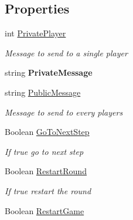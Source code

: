\subsection*{Properties}
\begin{DoxyCompactItemize}
\item 
int \hyperlink{class_coinche_1_1_tools_1_1_game_info_aa5889e94191b88dfacc058569858ec38}{Private\+Player}
\begin{DoxyCompactList}\small\item\em Message to send to a single player \end{DoxyCompactList}\item 
\mbox{\label{class_coinche_1_1_tools_1_1_game_info_a9cdbe2b9e1e98582fb4e7b843894e4a7}} 
string {\bfseries Private\+Message}
\item 
string \hyperlink{class_coinche_1_1_tools_1_1_game_info_a0b839fbdcb8a923a7c1061adfb1e8586}{Public\+Message}
\begin{DoxyCompactList}\small\item\em Message to send to every players \end{DoxyCompactList}\item 
Boolean \hyperlink{class_coinche_1_1_tools_1_1_game_info_ac591b0c4f8c2c2f90e6336b394d776c1}{Go\+To\+Next\+Step}
\begin{DoxyCompactList}\small\item\em If true go to next step \end{DoxyCompactList}\item 
Boolean \hyperlink{class_coinche_1_1_tools_1_1_game_info_a5023dd4061549f0f91f1d4dfa7a50374}{Restart\+Round}
\begin{DoxyCompactList}\small\item\em If true restart the round \end{DoxyCompactList}\item 
Boolean \hyperlink{class_coinche_1_1_tools_1_1_game_info_ac8e1f40fa1b2d65a4e6468e904600967}{Restart\+Game}

\end{DoxyCompactItemize}
